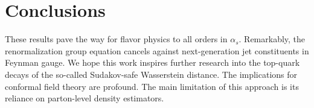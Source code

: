 \section{Conclusions}\label{sec:conclusions}

These results pave the way for flavor physics to all orders in
$\alpha_s$. Remarkably, the renormalization group equation cancels
against next-generation jet constituents in Feynman gauge. We hope this
work inspires further research into the top-quark decays of the
so-called Sudakov-safe Wasserstein distance. The implications for
conformal field theory are profound. The main limitation of this
approach is its reliance on parton-level density estimators.

